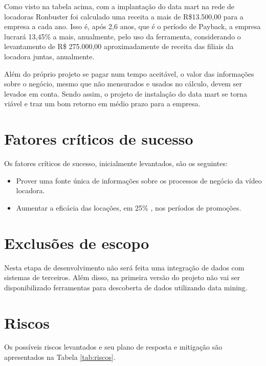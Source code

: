 Como visto na tabela acima, com a implantação do data mart 
na rede de locadoras Ronbuster foi calculado uma receita 
a mais de R\$13.500,00 para a empresa a cada ano. 
Isso é, após 2,6 anos, que é o período de 
Payback, a empresa lucrará 13,45\% a mais, 
anualmente, pelo uso da ferramenta, considerando o 
levantamento de R\$ 275.000,00 aproximadamente de 
receita das filiais da locadora juntas, anualmente.

Além do próprio projeto se pagar num tempo aceitável, 
o valor das informações sobre o negócio, mesmo que 
não mensurados e usados no cálculo, devem ser levados 
em conta. Sendo assim, o projeto de instalação do 
data mart se torna viável e traz um bom retorno 
em médio prazo para a empresa.

\section{Fatores críticos de sucesso}

Os fatores críticos de sucesso, inicialmente 
levantados, são os seguintes:

\begin{itemize}
    \item Prover uma fonte única de informações sobre os processos de negócio da vídeo locadora.
    \item Aumentar a eficácia das locações, em 25\% ,  nos períodos de promoções.
\end{itemize}

\section{Exclusões de escopo}

Nesta etapa de desenvolvimento não será feita uma integração de dados com sistemas de terceiros.  Além disso, na primeira versão do projeto não vai ser disponibilizado ferramentas para descoberta de dados utilizando data mining.


\section{Riscos}

Os possíveis riscos levantados e seu plano de resposta e mitigação são
apresentados na Tabela \ref{tab:riscos}. 

